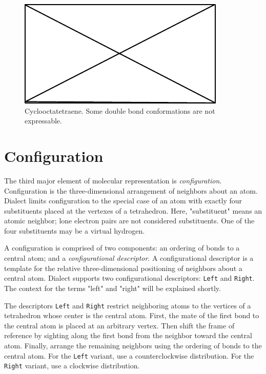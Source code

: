 \documentclass{article}
\def\ttt{\texttt}
\begin{document}
\begin{figure}
    \centering
    \includegraphics{filler}
    \caption{Cyclooctatetraene. Some double bond conformations are not expressable.}
    \label{fig:cyclooctatetraene}
\end{figure}

\section*{Configuration}

The third major element of molecular representation is \textit{configuration}. Configuration is the three-dimensional arrangement of neighbors about an atom. Dialect limits configuration to the special case of an atom with exactly four substituents placed at the vertexes of a tetrahedron. Here, "substituent" means an atomic neighbor; lone electron pairs are not considered substituents. One of the four substituents may be a virtual hydrogen.

A configuration is comprised of two components: an ordering of bonds to a central atom; and a \textit{configurational descriptor}. A configurational descriptor is a template for the relative three-dimensional positioning of neighbors about a central atom. Dialect supports two configurational descriptors: \ttt{Left} and \ttt{Right}. The context for the terms "left" and "right" will be explained shortly.

The descriptors \ttt{Left} and \ttt{Right} restrict neighboring atoms to the vertices of a tetrahedron whose center is the central atom. First, the mate of the first bond to the central atom is placed at an arbitrary vertex. Then shift the frame of reference by sighting along the first bond from the neighbor toward the central atom. Finally, arrange the remaining neighbors using the ordering of bonds to the central atom. For the \ttt{Left} variant, use a counterclockwise distribution. For the \ttt{Right} variant, use a clockwise distribution.
\end{document}
